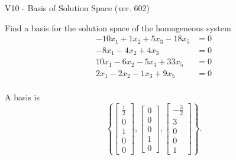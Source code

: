 \begin{exercise}
  \begin{exerciseTitle}V10 - Basis of Solution Space (ver. 602)\end{exerciseTitle}
  \begin{exerciseStatement}
    Find a basis for the solution space of the homogeneous system 
\begin{align*}
 -10 x_ 1 + 1 x_ 2 + 5 x_ 3 -18 x_ 5 &= 0  \\ 
  -8 x_ 1 -4 x_ 2 + 4 x_ 3 &= 0  \\ 
  10 x_ 1 -6 x_ 2 -5 x_ 3 + 33 x_ 5 &= 0  \\ 
  2 x_ 1 -2 x_ 2 -1 x_ 3 + 9 x_ 5 &= 0  \\ 
 \end{align*}


 
  \end{exerciseStatement}

  \begin{exerciseAnswer}
   A basis is   
\[\left\{\left[\begin{array}{c}
\frac{1}{2} \\
0 \\
1 \\
0 \\
0
\end{array}\right] , \left[\begin{array}{c}
0 \\
0 \\
0 \\
1 \\
0
\end{array}\right] , \left[\begin{array}{c}
-\frac{3}{2} \\
3 \\
0 \\
0 \\
1
\end{array}\right]\right\}.\]

  


  \end{exerciseAnswer}
\end{exercise}